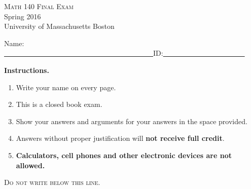 \documentclass[12pt]{article}
\begin{document}
\begin{center}
\Huge 
\Huge
\textsc{Math 140 Final Exam}\\
\Large Spring 2016\\
University of Massachusetts Boston
\end{center}

\medskip

\noindent Name: \underline{~~~~~~~~~~~~~~~~~~~~~~~~~~~~~~~~~~~~~~~~~~}\hfill ID:\underline{~~~~~~~~~~~~~~~~~~~~~~~}

\bigskip

\bigskip


\textbf{Instructions.}
\begin{enumerate}
\item Write your name on every page.
\item This is a closed book exam.
\item Show your answers and arguments for your answers in the space provided.
\item Answers without proper justification will \textbf{not receive full credit}.
\item \textbf{Calculators, cell phones and other electronic devices are not allowed.}
\end{enumerate}

\hrulefill \textsc{Do not write below this line. }\hrulefill
\end{document}
